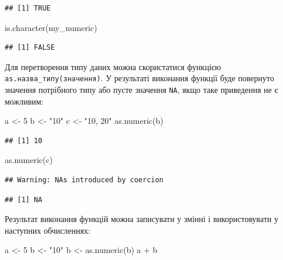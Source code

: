 \documentclass[
]{book}
\newenvironment{Shaded}{\begin{snugshade}}{\end{snugshade}}
\newcommand{\DecValTok}[1]{\textcolor[rgb]{0.00,0.00,0.81}{#1}}
\newcommand{\FunctionTok}[1]{\textcolor[rgb]{0.00,0.00,0.00}{#1}}
\newcommand{\NormalTok}[1]{#1}
\newcommand{\OtherTok}[1]{\textcolor[rgb]{0.56,0.35,0.01}{#1}}
\newcommand{\SpecialCharTok}[1]{\textcolor[rgb]{0.00,0.00,0.00}{#1}}
\newcommand{\StringTok}[1]{\textcolor[rgb]{0.31,0.60,0.02}{#1}}
\begin{document}
\begin{verbatim}
## [1] TRUE
\end{verbatim}

\begin{Shaded}
\begin{Highlighting}[]
\FunctionTok{is.character}\NormalTok{(my\_numeric)}
\end{Highlighting}
\end{Shaded}

\begin{verbatim}
## [1] FALSE
\end{verbatim}

Для перетворення типу даних можна скористатися функцією \texttt{as.назва\_типу(значення)}. У результаті виконання функції буде повернуто значення потрібного типу або пусте значення \texttt{NA}, якщо таке приведення не є можливим:

\begin{Shaded}
\begin{Highlighting}[]
\NormalTok{a }\OtherTok{\textless{}{-}} \DecValTok{5}
\NormalTok{b }\OtherTok{\textless{}{-}} \StringTok{"10"}
\NormalTok{c }\OtherTok{\textless{}{-}} \StringTok{"10, 20"}
\FunctionTok{as.numeric}\NormalTok{(b)}
\end{Highlighting}
\end{Shaded}

\begin{verbatim}
## [1] 10
\end{verbatim}

\begin{Shaded}
\begin{Highlighting}[]
\FunctionTok{as.numeric}\NormalTok{(c)}
\end{Highlighting}
\end{Shaded}

\begin{verbatim}
## Warning: NAs introduced by coercion
\end{verbatim}

\begin{verbatim}
## [1] NA
\end{verbatim}

Результат виконання функцій можна записувати у змінні і використовувати у наступних обчисленнях:

\begin{Shaded}
\begin{Highlighting}[]
\NormalTok{a }\OtherTok{\textless{}{-}} \DecValTok{5}
\NormalTok{b }\OtherTok{\textless{}{-}} \StringTok{"10"}
\NormalTok{b }\OtherTok{\textless{}{-}} \FunctionTok{as.numeric}\NormalTok{(b)}
\NormalTok{a }\SpecialCharTok{+}\NormalTok{ b}
\end{Highlighting}
\end{Shaded}
\end{document}
